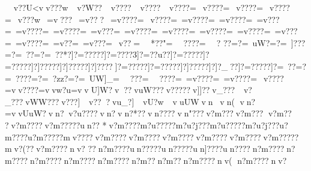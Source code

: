 {{{{{{{{{{{{{{{{{{{{{{{{{{{{{{{{{{{{{{{{{{{{{{{{{{{{{{{{{{{{{{{{{{{{{{{{{{{{{{{{{{{{{{{{{{{{{{{{{{{{{{{{{{{{{{{{{{{{{{{{{{{{{{{{{{{{{{{{{{{{{{{{{{{{{{{{{{{{{{{{{{{{{{{{{{{{{{{{{{{{{{{{{{{{{{{{{{{{{{{{{{{{{{{{{{{{{{{{{{{{{{{{{{{{{{{{{{{{{{{{{{{{{{{{{{{{{{{{{{{{{{{{{{{{{{{{{{{{{{{{{{{{{{{{{{{{{{{{{{{{{{{{{{{{{{{{{{{{{{{{{{{{{{{{{{{{{{{{{{{{{{{{{{{{{{{{{{{{{{{{{{{{{{{{{{{{{{{{{{{{{{{{{{{{{{{{{{{{{{{{{{{{{{{{{{{{{{{{{{{{{{{{{{{{{{{{{{{{{{{{{{{{{{{{{{{{{{{{{{{{{{{{{{{{{{{{{{{{{{{{{{{{{{{{{{{{{{{{{{{{{{{{{{{{{{{{{{{{{{{{{{{{{{{{{{{{{{{{{{{{{{{{{{{{{{{{{{{{{{{{{{{{{{{{{{{{{{{{{{{{{{{{{{{{{{{{{{{{{{{{{{{{{{{{{{{{{{{{{{{{{{{{{{{{{{{{{{{{{{{{{{{{{{{{{{{{{{{{{{{{{{{{{{{{{{{{{{{{{{{{{{{{{{{{{{{{{{{{{{{{{{{{{{{{{{{{{{{{{{{{{{{{{{{{{{{{{{{{{{{{{{{{{{{{{{{{{{{{{{{{{{{{{{{{{{{{{{{{{{{{{{{{{{{{{{{{{{{{{{{{{{{{{{{{{{{{{{{{{{{{{{{{{{{{{{{{{{{{{{{{{{{{{{{{{{{{{{{{{{{{{{{{{{{{{{{{{{{{{{{{{{{{{{{{{{{{{{{{{{{{{{{{{{{{{{{{{{{{{{{{{{{{{{{{{{{{{{{{{{{{{{{{{{{{{{{{{{{{{{{{{{{{{{{{{{{{{{{{{{{{{{{{{{{{{{{{{{{{{{{{{{{{{{{{{{{{{{{{{{{{{{{{{{{{{{{{{{{{{{{{{{{{{{{{{{{{{{{{{{{{{{{{{{{{{{{{{{{{{{{{{{{{{{{{{{{{{{{{{{{{{{{{{{{{{{{{{{{{{{{{{{{{{{{{{{{{{{{{{{{{{{{{{{{{{{{{{{{{{{{{{{{{{{{{{{{{{{{{{{{{{{{{{{{{{{{{{{{{{{{{{{{{{{{{{{{{{{{{{{{{{{{{{{{{{{{{{{{{{{{{{{{{{{{{{{{{{{{{{{{{{{{{{{{{{{{{{{{{{{{{{{{{{{{{{{{{{{{{{{{{{{{{{{{{{{{{{{{{{{{{{{{{{{{{{{{{{{{{{{{{{{{{{{{{{{{{{{{{{{{{{{{{{{{{{{{{{{{{{{{{{{{{{{{{{{{{{{{{{{{{{{{{{{{{{{{{{{{{{{{{{{{{{{{{{{{{{{{{{{{{{{{{{{{{{{{{{{{{{{{{{{{{{{{{{{{{{{{{{{{{{{{{{{{{{{{{{{{{{{{{{{{{{{{{{{{{{{{{{{{{{{{{{{{{{{{{{{{{{{{{{{{{{{{{{{{{{{{{{{{{{{{{{{{{{{{{{{{{{{{{{{{{{{{{{{{{{{{{{{{{{{{{{{{{{{{{{{{{{{{{{{{{{{{{{{{{{{{{{{{{{{{{{{{{{{{{{{{{{{{{{{{{{{{{{{{{{{{{{{{{{{{{{{{{{{{{{{{{{{{{{{{{{{{{{{{{{{{{{{{{{{{{{{{{{{{{{{{{{{{{{{{{{{{{{{{{{{{{{{{{{{{{{{{{{{{{{{{{{{{{{{{{{{{{{{{{{{{{{{{{{{{{{{{{{{{{{{{{{{{{{{{{{{{{{{{{{{{{{{{{{{{{{{{{{{{{{{{{{{{{{{{{{{{{{{{{{{{{{{{{{{{{{{{{{{{{{{{{{{{{{{{{{{{{{{{{{{{{{{{{{{{{{{{{{{{{{{{{{{{{{{{{{{{{{{{{{{{{{{{{{{{{{{{{{{{{{{{{{{{{{{{{{{{{{{{{{{{{{{{{{{{{{{{{{{{{{{{{{{{{{{{{{{{{{{{{{{{{{{{{{{{{{{{{{{{{{{{{{{{{{{{{{{{{{{{{{{{{{{{{{{{{{{{{{{{{{{{{{{{{{{{{{{{{{{{{{{{{{{{{{{{{{{{{{{{{{{{{{{{{{{{{{{{{{{{{{{{{{{{{{{{{{{{{{{{{{{{{{{{{{{{{{{{{{{{{{{{{{{{{{{{{{{{{{{{{{{{{{{{{{{{{{{{{{{{{{{{{{{{{{{{{{{{{{{{{{{{{{{{{{{{{{{{{{{{{{{{{{{{{{{{{{{{{{{{{{{{{{{{{{{{{{{{{{{{{{{{{{{{{{{{{{{{{{{{{{{{{{{{{{{{{{{{{{{{{{{{{{{{{{{{{{{{{{{{{~v?}?U<vv???w~v?W??~v????~v????~v????=~v????=~v????=~v????=~v???w~=v???~=v???~=v????=~v????=~=v????=~=v????=~=v???=~=v????=~=v????=~=v???=~=v????=~=v????=~=v????=~=v????=~=v???=~=v????=~=v??=~=v???=~v?? =~~*??"=~~????=~~?
??=?=~u}W?=?=~]???=?=~??=?=~??*?]?=?????]?=????3]?=??u??]?=?????]?=?????]?]?????]?]?????]?]????]?=?????]?=?????]?]?????]?]?_??]?=?????]?=~??=?=~????=?=~?zz?=?=~UW]_=~~??? =~~????=~=v????=~=v????=~v????=vv????=vvw?u}=vvU]W?}v?}?}vuW???}v?????}v]]}??}v_???~v?_???}vWW???}v???]~v???}vu_?]~vU}?w~vuUWvn  vn (  vn  ? =vvUuW?vn ? v?u????vn ?  vn?*??vn????vn"???v?m???v?m???
v?m??
?v?m????v?m?????un??
*v?m????m?u?????m?u?j???m?u?????m?u?j???u?m????u?m?????mv????v?m????v?m????v?m????v?m????v?m????v?m?????mv?(??v?m????nv? ??n?m????un?????un?????un]????un????n?m????n?m????n?m????n?m????n?m????n?m??n?m??n?m????nv(   n?m????nv? }}}}}}}}}}}}}}}}}}}}}}}}}}}}}}}}}}}}}}}}}}}}}}}}}}}}}}}}}}}}}}}}}}}}}}}}}}}}}}}}}}}}}}}}}}}}}}}}}}}}}}}}}}}}}}}}}}}}}}}}}}}}}}}}}}}}}}}}}}}}}}}}}}}}}}}}}}}}}}}}}}}}}}}}}}}}}}}}}}}}}}}}}}}}}}}}}}}}}}}}}}}}}}}}}}}}}}}}}}}}}}}}}}}}}}}}}}}}}}}}}}}}}}}}}}}}}}}}}}}}}}}}}}}}}}}}}}}}}}}}}}}}}}}}}}}}}}}}}}}}}}}}}}}}}}}}}}}}}}}}}}}}}}}}}}}}}}}}}}}}}}}}}}}}}}}}}}}}}}}}}}}}}}}}}}}}}}}}}}}}}}}}}}}}}}}}}}}}}}}}}}}}}}}}}}}}}}}}}}}}}}}}}}}}}}}}}}}}}}}}}}}}}}}}}}}}}}}}}}}}}}}}}}}}}}}}}}}}}}}}}}}}}}}}}}}}}}}}}}}}}}}}}}}}}}}}}}}}}}}}}}}}}}}}}}}}}}}}}}}}}}}}}}}}}}}}}}}}}}}}}}}}}}}}}}}}}}}}}}}}}}}}}}}}}}}}}}}}}}}}}}}}}}}}}}}}}}}}}}}}}}}}}}}}}}}}}}}}}}}}}}}}}}}}}}}}}}}}}}}}}}}}}}}}}}}}}}}}}}}}}}}}}}}}}}}}}}}}}}}}}}}}}}}}}}}}}}}}}}}}}}}}}}}}}}}}}}}}}}}}}}}}}}}}}}}}}}}}}}}}}}}}}}}}}}}}}}}}}}}}}}}}}}}}}}}}}}}}}}}}}}}}}}}}}}}}}}}}}}}}}}}}}}}}}}}}}}}}}}}}}}}}}}}}}}}}}}}}}}}}}}}}}}}}}}}}}}}}}}}}}}}}}}}}}}}}}}}}}}}}}}}}}}}}}}}}}}}}}}}}}}}}}}}}}}}}}}}}}}}}}}}}}}}}}}}}}}}}}}}}}}}}}}}}}}}}}}}}}}}}}}}}}}}}}}}}}}}}}}}}}}}}}}}}}}}}}}}}}}}}}}}}}}}}}}}}}}}}}}}}}}}}}}}}}}}}}}}}}}}}}}}}}}}}}}}}}}}}}}}}}}}}}}}}}}}}}}}}}}}}}}}}}}}}}}}}}}}}}}}}}}}}}}}}}}}}}}}}}}}}}}}}}}}}}}}}}}}}}}}}}}}}}}}}}}}}}}}}}}}}}}}}}}}}}}}}}}}}}}}}}}}}}}}}}}}}}}}}}}}}}}}}}}}}}}}}}}}}}}}}}}}}}}}}}}}}}}}}}}}}}}}}}}}}}}}}}}}}}}}}}}}}}}}}}}}}}}}}}}}}}}}}}}}}}}}}}}}}}}}}}}}}}}}}}}}}}}}}}}}}}}}}}}}}}}}}}}}}}}}}}}}}}}}}}}}}}}}}}}}}}}}}}}}}}}}}}}}}}}}}}}}}}}}}}}}}}}}}}}}}}}}}}}}}}}}}}}}}}}}}}}}}}}}}}}}}}}}}}}}}}}}}}}}}}}}}}}}}}}}}}}}}}}}}}}}}}}}}}}}}}}}}}}}}}}}}}}}}}}}}}}}}}}}}}}}}}}}}}}}}}}}}}}}}}}}}}}}}}}}}}}}}}}}}}}}}}}}}}}}}}}}}}}}}}}}}}}}}}}}}}}}}}}}}}}}}}}}}}}}}}}}}}}}}}}}}}}}}}}}}}}}}}}}}}}}}}}}}}}}}}}}}}}}}}}}}}}}}}}}}}}}}}}}}}}}}}}}}}}}}}}}}}}}}}}}}}}}}}}}}}}}}}}}}}}}}}}}}}}}}}}}}}}}}}}}}}}}}}}}}}}}}}}}}}}}}}}}}}}}}}}}}}}}}}}}}}}}}}}}}}}}}}}}}}}}}}}}}}}}}}}}}}}}}}}}}}}}}}}}}}}}}}}}}}}}}}}}}}}}}}}}}}}}}}}}}}}}}}}}}}}}}}}}}}}}}}}}}}}}}}}}}}}}}}}}}}}}}}}}}}}}}}}}}}}}}}}}}}}}}}}}}}}}}}}}}}}}}}}}}}}}}}}}}}}}}}}}}}}}}}}}}}}}}}}}}}}}}}}}}}}}}}}}}}}}}}}}}}}}}}}}}}}}}}}}}}}}}}}}}}}}}}}}}}}}}}}}}}}}}}}}}}}}}}}}}}}}}}}}}}}}}}}}}}}}}}}}}}}}}}}}}}}}}}}}}}}}}}}}}}}}}}}}}}}}}}}}}}}}}}}}}}}}}}}}}}}}}}}}}}}}}}}}}}}}}}}}}}}}}}}}}}}}}}}}}}}}}}}}}}}}}}}}}}}}}}}}}}}}}}}}}}}}}}}}}}}}}}}}}}}}}}}}}}}}}}}}}}}}}}}}}}}}}}}}}}}}}}}}}}}}}}}}}}}}}}}}}}}}}}}}}}}}}}}}}}}}}}}}}}}}}}}}}}}}}}}}}}}}}}}}}}}}}}}}}}}}}}}
